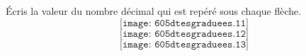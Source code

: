 \par\'Ecris la valeur du nombre décimal qui est repéré sous chaque flèche.
\[\texttt{[image: 605dtesgraduees.11]}\]
\[\texttt{[image: 605dtesgraduees.12]}\]
\[\texttt{[image: 605dtesgraduees.13]}\]